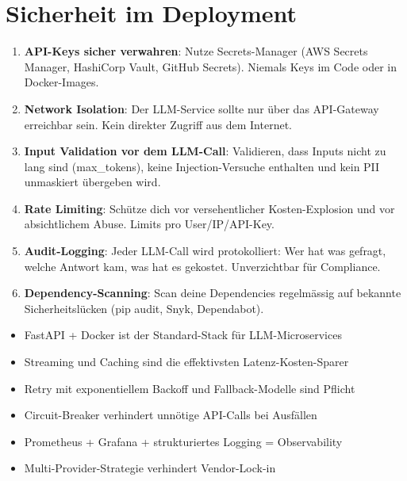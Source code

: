 \section{Sicherheit im Deployment}

\begin{enumerate}[leftmargin=*]
    \item \textbf{API-Keys sicher verwahren}: Nutze Secrets-Manager (AWS Secrets Manager, HashiCorp Vault, GitHub Secrets). Niemals Keys im Code oder in Docker-Images.
    \item \textbf{Network Isolation}: Der LLM-Service sollte nur über das API-Gateway erreichbar sein. Kein direkter Zugriff aus dem Internet.
    \item \textbf{Input Validation vor dem LLM-Call}: Validieren, dass Inputs nicht zu lang sind (max\_tokens), keine Injection-Versuche enthalten und kein PII unmaskiert übergeben wird.
    \item \textbf{Rate Limiting}: Schütze dich vor versehentlicher Kosten-Explosion und vor absichtlichem Abuse. Limits pro User/IP/API-Key.
    \item \textbf{Audit-Logging}: Jeder LLM-Call wird protokolliert: Wer hat was gefragt, welche Antwort kam, was hat es gekostet. Unverzichtbar für Compliance.
    \item \textbf{Dependency-Scanning}: Scan deine Dependencies regelmässig auf bekannte Sicherheitslücken (pip audit, Snyk, Dependabot).
\end{enumerate}

\begin{zusammenfassungEnv}
\begin{itemize}[leftmargin=*]
    \item FastAPI + Docker ist der Standard-Stack für LLM-Microservices
    \item Streaming und Caching sind die effektivsten Latenz-Kosten-Sparer
    \item Retry mit exponentiellem Backoff und Fallback-Modelle sind Pflicht
    \item Circuit-Breaker verhindert unnötige API-Calls bei Ausfällen
    \item Prometheus + Grafana + strukturiertes Logging = Observability
    \item Multi-Provider-Strategie verhindert Vendor-Lock-in
\end{itemize}
\end{zusammenfassungEnv}




